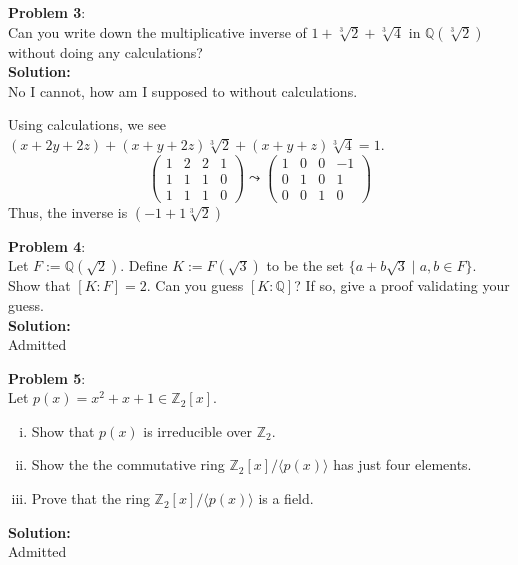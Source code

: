 \documentclass[11pt]{article}
\newcommand{\prob}[3]{\begin{flushleft}
        \textbf{Problem #1}: \\
        #2 
		\textbf{Solution:} 
		#3

\end{flushleft}}
\newcommand{\lr}[1]{
  \langle #1 \rangle
}
\begin{document}
\prob{3}{
  Can you write down the multiplicative inverse of $1 + \sqrt[3]{2} + \sqrt[3]{4}$ in $\mathbb{Q}(\sqrt[3]{2})$ without doing any calculations? \\
}{\\
  No I cannot, how am I supposed to without calculations.

  Using calculations, we see $(x + 2y + 2z) + (x + y + 2z) \sqrt[3]{2} + (x + y + z) \sqrt[3]{4} = 1$.
  $$\begin{pmatrix}
      1 & 2 & 2 & 1 \\
      1 & 1 & 1 & 0 \\
      1 & 1 & 1 & 0
    \end{pmatrix} \leadsto
    \begin{pmatrix}
      1 & 0 & 0 & -1  \\
      0 & 1 & 0 & 1 \\
      0 & 0 & 1 & 0
    \end{pmatrix}$$
  Thus, the inverse is $(-1 + 1 \sqrt[3]{2} )$
}

\prob{4}{
  Let $F := \mathbb{Q}(\sqrt{2})$. Define $K := F(\sqrt{3})$ to be the set $\{ a + b \sqrt{3} \mid a, b \in F \}$. Show that $[K : F] = 2$.
  Can you guess $[K : \mathbb{Q}]$? If so, give a proof validating your guess. \\
}{\\
  Admitted
}

\prob{5}{
Let $p(x) = x^2 + x + 1 \in \mathbb{Z}_2[x]$.
\begin{enumerate}[(i)]
  \item Show that $p(x)$ is irreducible over $\mathbb{Z}_2$.
  \item Show the the commutative ring $\mathbb{Z}_2[x] / \lr{p(x)}$ has just four elements.
  \item Prove that the ring $\mathbb{Z}_2[x] / \lr{p(x)}$ is a field.
\end{enumerate}
}{\\
Admitted
}
\end{document}
